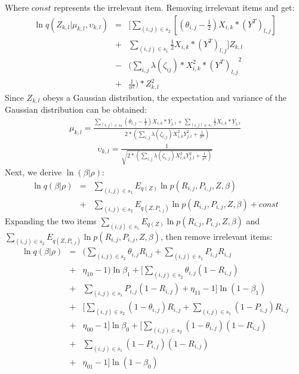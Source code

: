 \documentclass[journal]{IEEEtran}
\begin{document}
Where $const$ represents the irrelevant item.
Removing irrelevant items and get:
\begin{eqnarray*}
    \ln q(Z_{k,l}|\mu_{k,l},\upsilon_{k,l})&=&[\sum_{(i,j)\in s_2}[(\theta_{i,j}-\frac{1}{2})X_{i,k}*(Y^{T})_{l,j}]\\
    &+& \sum_{(i,j)\in s_1}\frac{1}{2}X_{i,k}*(Y^{T})_{l,j}]Z_{k,l}\\
    &-&(\sum_{i,j}\lambda(\zeta_{ij})*X^{2}_{i,k}*{(Y^{T})_{l,j}}^{2} \\
    &+&\frac{1}{\sigma^{2}})*Z^{2}_{k,l}
\end{eqnarray*}
Since $Z_{k,l}$ obeys a Gaussian distribution, the expectation and variance of the Gaussian distribution can be obtained:
\begin{eqnarray*}
\mu_{k,l} = \frac{\sum_{(i,j)\in s_2}(\theta_{i,j}-\frac{1}{2})X_{i,k}*Y_{j,l}+\sum_{(i,j)\in s_1}\frac{1}{2}X_{i,k}*Y_{j,l}}{2*(\sum_{i,j}\lambda(\zeta_{i,j})X^{2}_{i,k}Y_{j,l}^{2}+\frac{1}{\sigma^2})}
\end{eqnarray*}
\begin{eqnarray*}
\upsilon_{k,l} = \frac{1}{\sqrt{2*(\sum_{i,j}\lambda(\zeta_{i,j})X^{2}_{i,k}Y_{j,l}^{2}+\frac{1}{\sigma^2})}}
\end{eqnarray*}
Next, we derive $\ln(\beta|\rho)$:
\begin{eqnarray*}
    \ln q(\beta|\rho) 
    &=& \sum_{(i,j)\in s_1}E_{q(Z)}{\ln p(R_{i,j},P_{i,j},Z,\beta)}  \nonumber \\ 
    &+& \sum_{(i,j)\in s_2}E_{q(Z,P_{i,j})}{\ln p(R_{i,j},P_{i,j},Z,\beta)} + const
\end{eqnarray*}
Expanding the two items $\sum_{(i,j)\in s_1}E_{q(Z)}{\ln p(R_{i,j},P_{i,j},Z,\beta)}$ and $\sum_{(i,j)\in s_2}E_{q(Z,P_{i,j})}{\ln p(R_{i,j},P_{i,j},Z,\beta)}$, then remove irrelevant items: 
\begin{eqnarray*}
    \ln q(\beta|\rho) &=& (\sum_{(i,j)\in s_2}\theta _{i,j}R_{i,j} + \sum_{(i,j)\in s_1}P_{i,j}R_{i,j} \\
    &+&\eta_{10}-1)\ln{\beta_{1}}+[\sum_{(i,j)\in s_2}\theta_{i,j} (1-R_{i,j}) \\
    &+& \sum_{(i,j)\in s_1}P_{i,j}(1-R_{i,j})+\eta_{11}-1]\ln(1-\beta_{1}) \\
    &+&[\sum_{(i,j)\in s_2}(1-\theta_{i,j})R_{i,j} + \sum_{(i,j)\in s_1}(1-P_{i,j})R_{i,j} \\ 
    &+&\eta_{00}-1]\ln{\beta_0} +[\sum_{(i,j)\in s_2}(1-\theta_{i,j})(1-R_{i,j}) \\ 
    &+& \sum_{(i,j)\in s_1}(1-P_{i,j})(1-R_{i,j}) \\
    &+&\eta_{01}-1]\ln(1-\beta_{0})
\end{eqnarray*}
\end{document}
